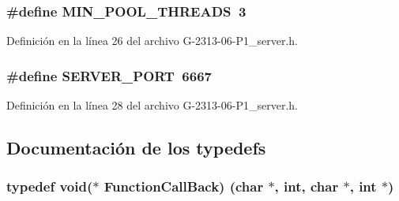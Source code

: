 \subsubsection[{\texorpdfstring{M\+I\+N\+\_\+\+P\+O\+O\+L\+\_\+\+T\+H\+R\+E\+A\+DS}{MIN_POOL_THREADS}}]{\setlength{\rightskip}{0pt plus 5cm}\#define M\+I\+N\+\_\+\+P\+O\+O\+L\+\_\+\+T\+H\+R\+E\+A\+DS~3}\hypertarget{G-2313-06-P1__server_8h_a80c7be19e867e55f90be3fa66cf65300}{}\label{G-2313-06-P1__server_8h_a80c7be19e867e55f90be3fa66cf65300}


Definición en la línea 26 del archivo G-\/2313-\/06-\/\+P1\+\_\+server.\+h.

\subsubsection[{\texorpdfstring{S\+E\+R\+V\+E\+R\+\_\+\+P\+O\+RT}{SERVER_PORT}}]{\setlength{\rightskip}{0pt plus 5cm}\#define S\+E\+R\+V\+E\+R\+\_\+\+P\+O\+RT~6667}\hypertarget{G-2313-06-P1__server_8h_ac42367fe5c999ec6650de83e9d72fe8c}{}\label{G-2313-06-P1__server_8h_ac42367fe5c999ec6650de83e9d72fe8c}


Definición en la línea 28 del archivo G-\/2313-\/06-\/\+P1\+\_\+server.\+h.



\subsection{Documentación de los \textquotesingle{}typedefs\textquotesingle{}}
\subsubsection[{\texorpdfstring{Function\+Call\+Back}{FunctionCallBack}}]{\setlength{\rightskip}{0pt plus 5cm}typedef void($\ast$ Function\+Call\+Back) (char $\ast$, int, char $\ast$, int $\ast$)}\hypertarget{G-2313-06-P1__server_8h_ae102cd0a63430b827183f70ce476a887}{}\label{G-2313-06-P1__server_8h_ae102cd0a63430b827183f70ce476a887}


